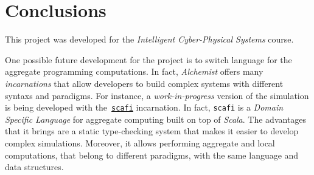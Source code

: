\section{Conclusions}
This project was developed for the \textit{Intelligent Cyber-Physical Systems} course.

One possible future development for the project is to switch language for the aggregate programming computations.
In fact, \textit{Alchemist} offers many \textit{incarnations} that allow developers to build complex systems with different syntaxs and paradigms.
For instance, a \textit{work-in-progress} version of the simulation is being developed with the~\href{https://scafi.github.io/}{\texttt{scafi}} incarnation.
In fact, \texttt{scafi} is a \textit{Domain Specific Language} for aggregate computing built on top of \textit{Scala}.
The advantages that it brings are a static type-checking system that makes it easier to develop complex simulations.
Moreover, it allows performing aggregate and local computations, that belong to different paradigms, with the same language and data structures.
